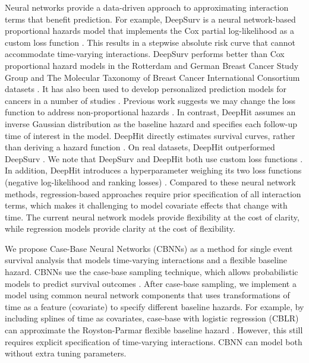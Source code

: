 \documentclass[preprint,12pt,authoryear]{elsarticle}
\begin{document}
Neural networks provide a data-driven approach to approximating interaction terms that benefit prediction. For example,
DeepSurv is a neural network-based proportional hazards model that implements the Cox partial log-likelihood
as a custom loss function \citep{katzman2018DeepSurv}. This results in a stepwise absolute risk curve that cannot
accommodate time-varying interactions. DeepSurv performs better than Cox proportional hazard models in the Rotterdam and German Breast Cancer Study Group and The Molecular Taxonomy of Breast Cancer International Consortium datasets \citep{katzman2018DeepSurv}. It has also been used to develop personalized prediction models for cancers in a number of studies \citep{ds1} \citep{ds2} \citep{ds3}. Previous work suggests we may change the loss function to address
non-proportional hazards \citep{faraggi1995neural}. In contrast, DeepHit assumes an inverse Gaussian distribution
as the baseline hazard \citep{lee2018DeepHit} and specifies each follow-up time of interest in the model. DeepHit
directly estimates survival curves, rather than deriving a hazard function \citep{lee2018DeepHit}. On real datasets,
DeepHit outperformed DeepSurv \citep{lee2018DeepHit}. We note that DeepSurv and DeepHit both use custom loss
functions \citep{katzman2018DeepSurv} \citep{lee2018DeepHit}. In addition, DeepHit introduces a hyperparameter
weighing its two loss functions (negative log-likelihood and ranking losses) \citep{lee2018DeepHit}. Compared
to these neural network methods, regression-based approaches require prior specification of all interaction terms,
which makes it challenging to model covariate effects that change with time. The current neural network models
provide flexibility at the cost of clarity, while regression models provide clarity at the cost of flexibility.

We propose Case-Base Neural Networks (CBNNs) as a method for single event survival analysis that models
time-varying interactions and a flexible baseline hazard. CBNNs use the case-base sampling technique, which
allows probabilistic models to predict survival outcomes \citep{hanley2009}. After case-base sampling, we
implement a model using common neural network components that uses transformations of time as a feature
(covariate) to specify different baseline hazards. For example, by including splines of time as covariates,
case-base with logistic regression (CBLR) can approximate the Royston-Parmar flexible baseline hazard
\citep{royston2002flexible} \citep{hanley2009}. However, this still requires explicit specification of
time-varying interactions. CBNN can model both without extra tuning parameters.
\end{document}
